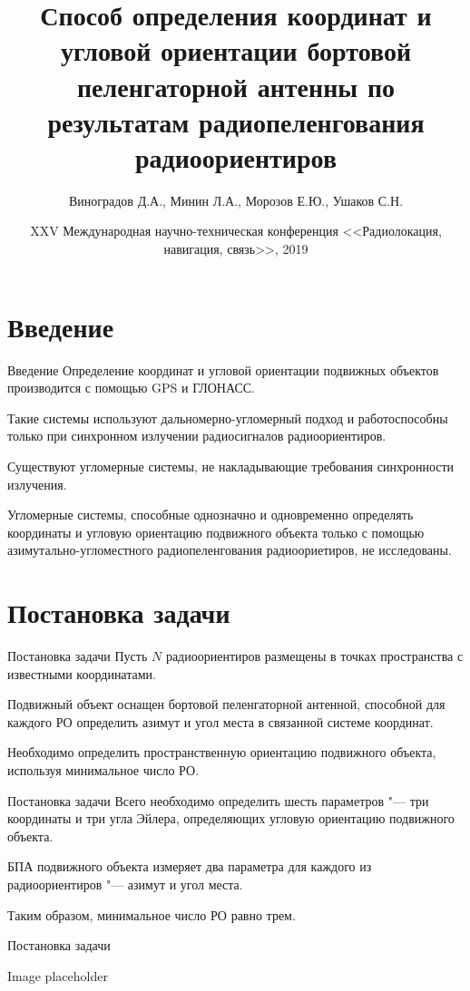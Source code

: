 \documentclass[russian,hyperref={unicode}]{beamer}
\title{Способ определения координат и угловой ориентации бортовой пеленгаторной антенны по результатам радиопеленгования радиоориентиров}
\institute
{
  \inst{1}%
  Военно-воздушная академия имени профессора Н.Е.Жуковского и Ю.А.Гагарина\\
  \inst{2}%
	Воронежский Государственный Университет
}
\author
{
  Виноградов Д.А.\inst{1}, Минин Л.А.\inst{2}, Морозов Е.Ю.\inst{2}, Ушаков С.Н\inst{2}.
}
\date[RLNC 2019]{XXV Международная научно-техническая конференция <<Радиолокация, навигация, связь>>, 2019}
\begin{document}
  \frame{\titlepage}

  \section{Введение}
  \begin{frame}{Введение}
    Определение координат и угловой ориентации подвижных объектов производится с
    помощью GPS и ГЛОНАСС.

    Такие системы используют дальномерно-угломерный подход и работоспособны только
    при синхронном излучении радиосигналов радиоориентиров.

    Существуют угломерные системы, не накладывающие требования синхронности излучения.

    Угломерные системы, способные однозначно и одновременно определять координаты и
    угловую ориентацию подвижного объекта только с помощью азимутально-угломестного радиопеленгования
    радиоориетиров, не исследованы.
  \end{frame}

  \section{Постановка задачи}
  \begin{frame}{Постановка задачи}
      Пусть $N$ радиоориентиров размещены в точках пространства с известными координатами.

      Подвижный объект оснащен бортовой пеленгаторной антенной, способной для каждого
      РО определить азимут и угол места в связанной системе координат.

      Необходимо определить пространственную ориентацию подвижного объекта,
      используя минимальное число РО.
  \end{frame}

  \begin{frame}{Постановка задачи}
    Всего необходимо определить шесть параметров "--- три координаты и три угла Эйлера,
    определяющих угловую ориентацию подвижного объекта.

    БПА подвижного объекта измеряет два параметра для каждого из радиоориентиров "---
    азимут и угол места.

    Таким образом, минимальное число РО равно трем.
  \end{frame}

  \begin{frame}{Постановка задачи}
    \begin{center}
      Image placeholder
    \end{center}
  \end{frame}
\end{document}
